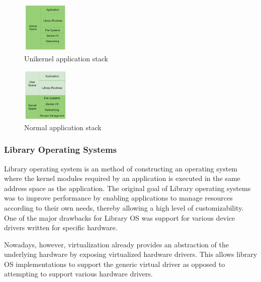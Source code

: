 \begin{figure}[htbp!] 
  \centering    
  \includegraphics[width=0.2\textwidth]{unikernel_application_stack}
  \caption[Unikernel]{Unikernel application stack \cite{UnikernelSurvey}}
  \label{fig:unikernel_application_stack}
  \end{figure}

  \begin{figure}[htbp!] 
    \centering    
    \includegraphics[width=0.2\textwidth]{normal_application_stack}
    \caption[Normal]{Normal application stack \cite{UnikernelSurvey}}
    \label{fig:normal_application_stack}
    \end{figure}

\subsubsection{Library Operating Systems}
Library\cite{LibraryOS} operating system is an method of constructing an operating system where the kernel modules  
required by an application is executed in the same address space as the application. The original goal 
of Library operating systems was to improve performance by enabling applications to manage resources according to 
their own needs, thereby allowing a high level of customizability. One of the major drawbacks for 
Library OS was support for various device drivers written for specific hardware. 

Nowadays, however, virtualization already provides an abstraction of the underlying hardware by exposing 
virtualized hardware drivers. This allows library OS implementations to support the generic virtual driver 
as opposed to attempting to support various hardware drivers.



